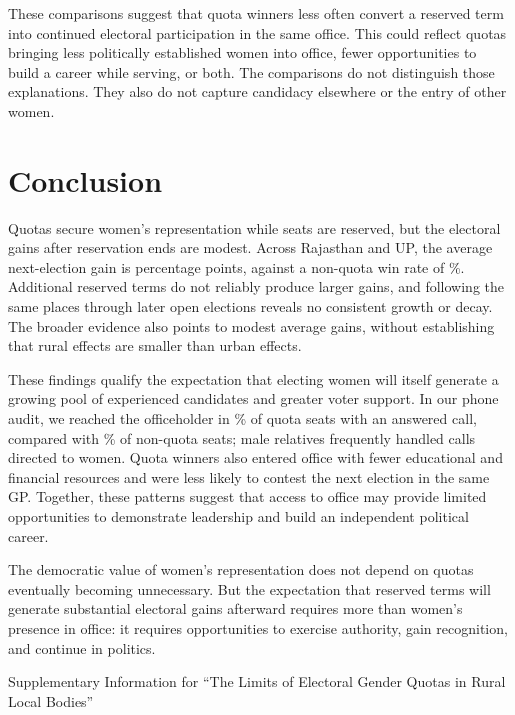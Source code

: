 \documentclass[11pt]{article}
\begin{document}
These comparisons suggest that quota winners less often convert a reserved term into continued electoral participation in the same office. This could reflect quotas bringing less politically established women into office, fewer opportunities to build a career while serving, or both. The comparisons do not distinguish those explanations. They also do not capture candidacy elsewhere or the entry of other women.

\section{Conclusion}\label{sec:conclusion}

Quotas secure women's representation while seats are reserved, but the electoral gains after reservation ends are modest. Across Rajasthan and UP, the average next-election gain is \poolEstimate{} percentage points, against a non-quota win rate of \poolControl{}\%. Additional reserved terms do not reliably produce larger gains, and following the same places through later open elections reveals no consistent growth or decay. The broader evidence also points to modest average gains, without establishing that rural effects are smaller than urban effects.

These findings qualify the expectation that electing women will itself generate a growing pool of experienced candidates and greater voter support. In our phone audit, we reached the officeholder in \phoneQuotaMemberWhole{}\% of quota seats with an answered call, compared with \phoneOpenMemberWhole{}\% of non-quota seats; male relatives frequently handled calls directed to women. Quota winners also entered office with fewer educational and financial resources and were less likely to contest the next election in the same GP. Together, these patterns suggest that access to office may provide limited opportunities to demonstrate leadership and build an independent political career.

The democratic value of women's representation does not depend on quotas eventually becoming unnecessary. But the expectation that reserved terms will generate substantial electoral gains afterward requires more than women's presence in office: it requires opportunities to exercise authority, gain recognition, and continue in politics.

\clearpage
\newpage



\clearpage
\newpage
\begin{center}
 \vspace{36pt}
\LARGE{Supplementary Information for ``The Limits of Electoral Gender Quotas in Rural Local
Bodies''}
\end{center}
\end{document}
